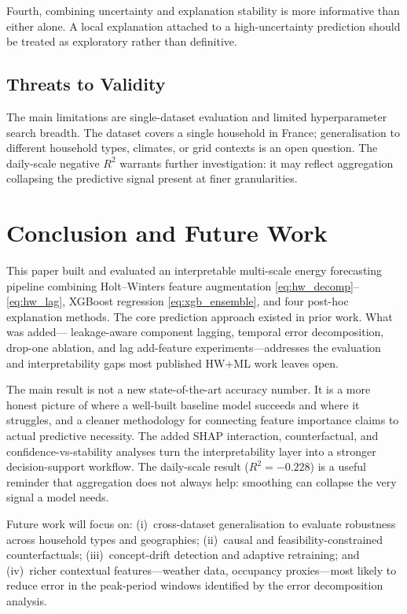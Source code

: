\documentclass[10pt,twocolumn,letterpaper]{article}
\begin{document}
Fourth, combining uncertainty and explanation stability is more
informative than either alone. A local explanation attached to a
high-uncertainty prediction should be treated as exploratory rather
than definitive.

\subsection{Threats to Validity}

The main limitations are single-dataset evaluation and limited
hyperparameter search breadth. The dataset covers a single household in France;
generalisation to different household types, climates, or grid
contexts is an open question. The daily-scale negative $R^2$ warrants
further investigation: it may reflect aggregation collapsing the
predictive signal present at finer granularities.

\section{Conclusion and Future Work}

This paper built and evaluated an interpretable multi-scale energy
forecasting pipeline combining Holt--Winters feature augmentation
\eqref{eq:hw_decomp}--\eqref{eq:hw_lag}, XGBoost regression
\eqref{eq:xgb_ensemble}, and four post-hoc explanation methods. The
core prediction approach existed in prior work. What was added---
leakage-aware component lagging, temporal error decomposition, drop-one
ablation, and lag add-feature experiments---addresses the evaluation
and interpretability gaps most published HW+ML work leaves open.

The main result is not a new state-of-the-art accuracy number. It is a
more honest picture of where a well-built baseline model succeeds and
where it struggles, and a cleaner methodology for connecting feature
importance claims to actual predictive necessity. The added SHAP
interaction, counterfactual, and confidence-vs-stability analyses turn
the interpretability layer into a stronger decision-support workflow.
The daily-scale result ($R^2 = -0.228$) is a useful reminder that
aggregation does not always help: smoothing can collapse the very
signal a model needs.

Future work will focus on: (i)~cross-dataset generalisation to
evaluate robustness across household types and geographies;
(ii)~causal and feasibility-constrained counterfactuals;
(iii)~concept-drift detection and adaptive retraining;
and (iv)~richer contextual features---weather data, occupancy
proxies---most likely to reduce error in the peak-period windows
identified by the error decomposition analysis.
\end{document}
